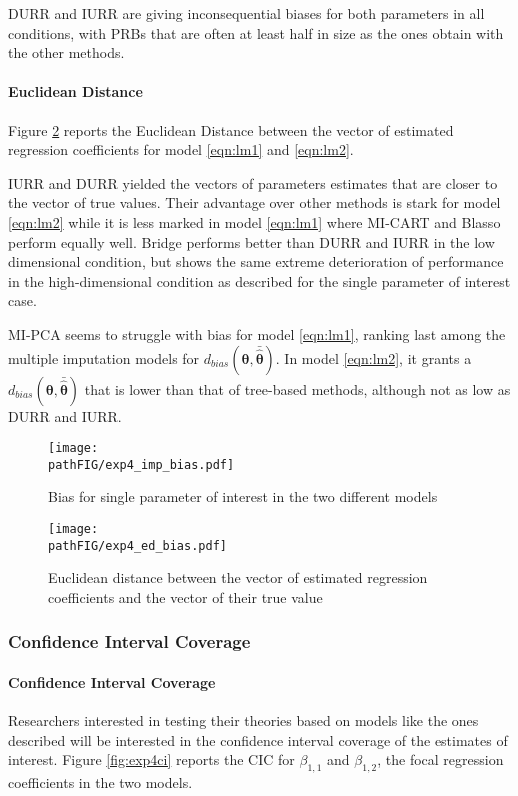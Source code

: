 	DURR and IURR are giving inconsequential biases for both parameters in all conditions, with PRBs that are
	often at least half in size as the ones obtain with the other methods.

	\paragraph{Euclidean Distance}
	Figure \ref{fig:exp4biased} reports the Euclidean Distance between the vector of estimated regression 
	coefficients for model \ref{eqn:lm1} and \ref{eqn:lm2}.

	IURR and DURR yielded the vectors of parameters estimates that are closer to the vector of true values.
	Their advantage over other methods is stark for model \ref{eqn:lm2} while it is less marked 
	in model \ref{eqn:lm1} where MI-CART and Blasso perform equally well. 
	Bridge performs better than DURR and IURR in the low dimensional condition, but shows the same extreme 
	deterioration of performance in the high-dimensional condition as described for the single parameter of 
	interest case.

	MI-PCA seems to struggle with bias for model \ref{eqn:lm1}, ranking last among the multiple imputation models for
	$d_{bias}(\bm{\theta},\bar{\hat{\bm{\theta}}})$.
	In model \ref{eqn:lm2}, it grants a $d_{bias}(\bm{\theta},\bar{\hat{\bm{\theta}}})$ that is lower than that of 
	tree-based methods, although not as low as DURR and IURR.

\begin{figure}
	\texttt{[image: \\pathFIG/exp4\_imp\_bias.pdf]}
	\caption{Bias for single parameter of interest in the two different models}
	\label{fig:exp4bias}
\end{figure}

\begin{figure}
	\texttt{[image: \\pathFIG/exp4\_ed\_bias.pdf]}
	\caption{Euclidean distance between the vector of estimated regression coefficients and
		the vector of their true value}
	\label{fig:exp4biased}
\end{figure}


\subsubsection{Confidence Interval Coverage}

	\paragraph{Confidence Interval Coverage}
	Researchers interested in testing their theories based on models like the ones described will be interested
	in the confidence interval coverage of the estimates of interest.
	Figure \ref{fig:exp4ci} reports the CIC for $\beta_{1,1}$ and $\beta_{1,2}$, the focal regression coefficients 
	in the two models.

